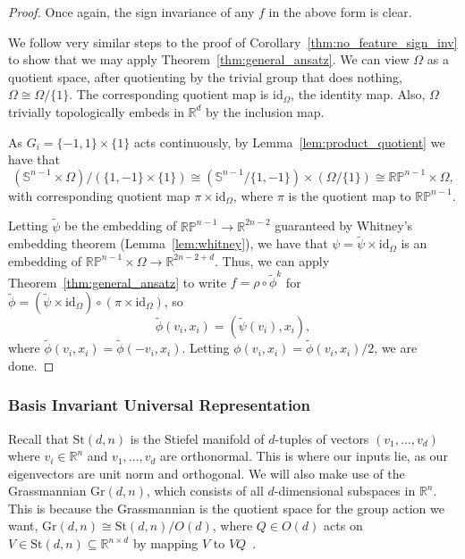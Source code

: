 \documentclass{article} \usepackage{iclr2023_conference,times}
\newcommand{\RR}{\mathbb R}
\newcommand{\PP}{\mathbb P}
\renewcommand{\SS}{\mathbb S}
\newcommand{\mrm}[1]{\mathrm{#1}}
\newcommand{\st}{\mrm{St}}
\newcommand{\gr}{\mrm{Gr}}
\begin{document}
\begin{proof}
    Once again, the sign invariance of any $f$ in the above form is clear.

    We follow very similar steps to the proof of Corollary~\ref{thm:no_feature_sign_inv} to show that we may apply Theorem~\ref{thm:general_ansatz}. We can view $\Omega$ as a quotient space, after quotienting by the trivial group that does nothing, $\Omega \cong \Omega / \{1\}$. The corresponding quotient map is $\mrm{id}_\Omega$, the identity map. Also, $\Omega$ trivially topologically embeds in $\RR^d$ by the inclusion map.

    As $G_i = \{-1, 1\} \times \{1\}$ acts continuously, by Lemma~\ref{lem:product_quotient} we have that
    \begin{equation}
        (\SS^{n-1} \times \Omega) / (\{1, -1\} \times \{1\}) \cong (\SS^{n-1}/\{1, -1\}) \times (\Omega / \{1\}) \cong \RR\PP^{n-1} \times \Omega,
    \end{equation}
    with corresponding quotient map $\pi \times \mrm{id}_\Omega$, where $\pi$ is the quotient map to $\RR\PP^{n-1}$. 

    Letting $\tilde \psi$ be the embedding of $\RR\PP^{n-1} \to \RR^{2n-2}$ guaranteed by Whitney's embedding theorem (Lemma~\ref{lem:whitney}), we have that $\psi = \tilde \psi \times \mrm{id}_\Omega$ is an embedding of $\RR\PP^{n-1} \times \Omega \to \RR^{2n-2 + d}$. Thus, we can apply Theorem~\ref{thm:general_ansatz} to write $f = \rho \circ \tilde \phi^k$ for $\tilde \phi = (\tilde \psi \times \mrm{id}_\Omega) \circ (\pi \times \mrm{id}_\Omega)$, so
    \begin{equation}
        \tilde \phi(v_i, x_i) = (\tilde \psi(v_i), x_i),
    \end{equation}
    where $\tilde \phi(v_i, x_i) = \tilde \phi(-v_i, x_i)$. Letting $\phi(v_i, x_i) = \tilde \phi(v_i, x_i)/2$, we are done.
\end{proof}


\subsubsection{Basis Invariant Universal Representation}

Recall that $\st(d, n)$ is the Stiefel manifold of $d$-tuples of vectors $(v_1, \ldots, v_d)$ where $v_i \in \RR^n$ and $v_1, \ldots, v_d$ are orthonormal. This is where our inputs lie, as our eigenvectors are unit norm and orthogonal. We will also make use of the Grassmannian $\gr(d, n)$, which consists of all $d$-dimensional subspaces in $\RR^n$. This is because the Grassmannian is the quotient space for the group action we want, $\gr(d, n) \cong \st(d,n) / O(d)$, where $Q \in O(d)$ acts on $V \in \st(d,n) \subseteq \RR^{n \times d}$ by mapping $V$ to $VQ$~\citep{gallier2020differential}.
\end{document}
